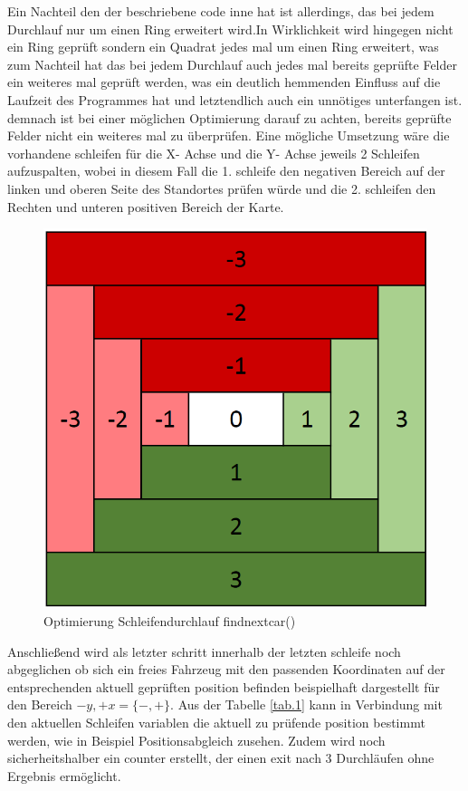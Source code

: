 \documentclass[conference]{IEEEtran}
\begin{document}
Ein Nachteil den der beschriebene code inne hat ist allerdings, das bei jedem Durchlauf nur um einen Ring erweitert wird.In Wirklichkeit wird hingegen nicht ein Ring geprüft sondern ein Quadrat jedes mal um einen Ring erweitert, was zum Nachteil hat das bei jedem Durchlauf auch jedes mal bereits geprüfte Felder ein weiteres mal geprüft werden, was ein deutlich hemmenden Einfluss auf die Laufzeit des Programmes hat und letztendlich auch ein unnötiges unterfangen ist. demnach ist bei einer möglichen Optimierung darauf zu achten, bereits geprüfte Felder nicht ein weiteres mal zu überprüfen. Eine mögliche Umsetzung wäre die vorhandene schleifen für die X- Achse  und die Y- Achse jeweils 2 Schleifen aufzuspalten, wobei in diesem Fall die 1. schleife den negativen Bereich auf der linken und oberen Seite des Standortes prüfen würde und die 2. schleifen den Rechten und unteren positiven Bereich der Karte.
\begin{figure}[h]
\caption{Optimierung Schleifendurchlauf findnextcar()}
\centering
\includegraphics[scale=0.5]{opti_findnextcar}
\end{figure}
Anschließend wird als letzter schritt innerhalb der letzten schleife noch abgeglichen ob sich ein freies Fahrzeug mit den passenden Koordinaten auf der entsprechenden aktuell geprüften position befinden beispielhaft dargestellt für den Bereich $-y,+x = \{-,+\}$. Aus der Tabelle \ref{tab.1} kann in Verbindung mit den  aktuellen Schleifen variablen die aktuell zu prüfende position bestimmt werden, wie in Beispiel Positionsabgleich zusehen. Zudem wird noch sicherheitshalber ein counter erstellt, der einen exit nach 3 Durchläufen ohne Ergebnis ermöglicht. 
\end{document}

